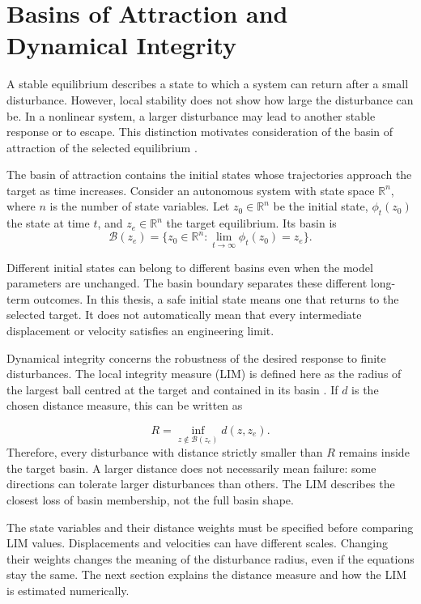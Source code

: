 \section{Basins of Attraction and Dynamical Integrity}
\label{sec:basins}

\begin{revision}
A stable equilibrium describes a state to which a system can return after a small disturbance. However, local stability does not show how large the disturbance can be. In a nonlinear system, a larger disturbance may lead to another stable response or to escape. This distinction motivates consideration of the basin of attraction of the selected equilibrium \cite{ref2,ref3,ref12}.
\end{revision}

\begin{revision}
The basin of attraction contains the initial states whose trajectories approach the target as time increases. Consider an autonomous system with state space $\mathbb{R}^n$, where $n$ is the number of state variables. Let $z_0\in\mathbb{R}^n$ be the initial state, $\phi_t(z_0)$ the state at time $t$, and $z_e\in\mathbb{R}^n$ the target equilibrium. Its basin is
\begin{equation}
  \mathcal{B}(z_e)=\{z_0\in\mathbb{R}^n:\lim_{t\to\infty}\phi_t(z_0)=z_e\}.
  \label{eq:basin}
\end{equation}
\end{revision}
Different initial states can belong to different basins even when the model parameters are unchanged. The basin boundary separates these different long-term outcomes. In this thesis, a safe initial state means one that returns to the selected target. It does not automatically mean that every intermediate displacement or velocity satisfies an engineering limit.

\begin{revision}
Dynamical integrity concerns the robustness of the desired response to finite disturbances. The local integrity measure (LIM) is defined here as the radius of the largest ball centred at the target and contained in its basin \cite{ref12}. If $d$ is the chosen distance measure, this can be written as
\end{revision}
\begin{equation}
  R=\inf_{z\notin\mathcal{B}(z_e)} d(z,z_e).
  \label{eq:true-lim}
\end{equation}
Therefore, every disturbance with distance strictly smaller than $R$ remains inside the target basin. A larger distance does not necessarily mean failure: some directions can tolerate larger disturbances than others. The LIM describes the closest loss of basin membership, not the full basin shape.

The state variables and their distance weights must be specified before comparing LIM values. Displacements and velocities can have different scales. Changing their weights changes the meaning of the disturbance radius, even if the equations stay the same. The next section explains the distance measure and how the LIM is estimated numerically.
